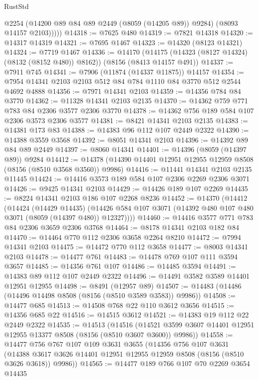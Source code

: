\begin{lexlean}{RustStd}
\begin{coremodule}
{\begin{coremodule}
{{{{{{{{{{{{{{{{{{{{{{{{{{{{{{{{{{            @2254
            (@14200 @89 @84 @89 @2449 (@8059 (@14205 @89)) @9284)
            (@8093 @14157 @2103)))))
@14318 := @7625 @480
@14319 := @7821 @14318
@14320 := @14317 @14319
@14321 := @7695 @1467
@14323 := @14320 (@8123 @14321)
@14324 := @7719 @1467
@14336 := @14170
    (@14175 (@14323 (@8127 @14324) (@8132 (@8152 @480)) @8162))
    (@8156 (@8413 @14157 @491))
@14337 := @7911 @745
@14341 := @7906 (@11874 (@14337 @11875)) @14157
@14354 := @7954 @14341 @2103 @2103 @512 @84 @784 @1110 @84 @3770 @512 @2544 @4692 @4888
@14356 := @7971 @14341 @2103
@14359 := @14356 @784 @84 @3770
@14362 := @11328 @14341 @2103 @2135
@14370 := @14362 @759 @771 @783 @84 @2306 @3577 @2306 @3770
@14378 := @14362 @756 @189 @584 @107 @2306 @3573 @2306 @3577
@14381 := @8421 @14341 @2103 @2135
@14383 := @14381 @173 @83
@14388 := @14383 @96 @112 @107 @2449 @2322
@14390 := @14388 @3559 @3568
@14392 := @8051 @14341 @2103
@14396 := @14392 @89 @84 @89 @2449
@14397 := @8060 @14341
@14401 := @14396 (@8059 (@14397 @89)) @9284
@14412 := @14378 (@14390 @14401 @12951 @12955 @12959 @8508 (@8156 (@8510 @3568 @3560)) @9986)
@14416 := @11441 @14341 @2103 @2135 @11445
@14424 := @14416 @3573 @189 @584 @107 @2306 @2269 @2306 @3071
@14426 := @9425 @14341 @2103
@14429 := @14426 @189 @107 @2269
@14435 := @8224 @14341 @2103 @186 @107 @2268 @8236
@14452 := @14370
    (@14412
      (@14424
        (@14429 @14435)
        (@14426 @584 @107 @3071 (@14392 @480 @107 @480 @3071 (@8059 (@14397 @480)) @12327))))
@14460 := @14416 @3577 @771 @783 @84 @2306 @3659 @2306 @3768
@14464 := @8178 @14341 @2103 @182 @84
@14470 := @14464 @770 @112 @2306 @3658 @2264 @8210
@14472 := @7994 @14341 @2103
@14475 := @14472 @770 @112 @3658
@14477 := @8003 @14341 @2103
@14478 := @14477 @761
@14483 := @14478 @769 @107 @111 @3594 @3657
@14485 := @14356 @761 @107
@14486 := @14485 @3594
@14491 := @14383 @89 @112 @107 @2449 @2322
@14496 := @14491 @3582 @3589 @14401 @12951 @12955
@14498 := @8491 (@12957 @89)
@14507 := @14483 (@14486 (@14496 @14498 @8508 (@8156 (@8510 @3589 @3583)) @9986))
@14508 := @14477 @685
@14513 := @14508 @768 @22 @110 @3612 @3656
@14515 := @14356 @685 @22
@14516 := @14515 @3612
@14521 := @14383 @19 @112 @22 @2449 @2322
@14535 := @14513
    (@14516
      (@14521 @3599 @3607 @14401 @12951 @12955 @13377 @8508 (@8156 (@8510 @3607 @3600)) @9986))
@14558 := @14477
    @756
    @767
    @107
    @109
    @3631
    @3655
    (@14356
      @756
      @107
      @3631
      (@14388 @3617 @3626 @14401 @12951 @12955 @12959 @8508 (@8156 (@8510 @3626 @3618)) @9986))
@14565 := @14477 @189 @766 @107 @70 @2269 @3654 @14435
}}}}}}}}}}}}}}}}}}}}}}}}}}}}}}}}}}
\end{coremodule}}
\end{coremodule}
\end{lexlean}

